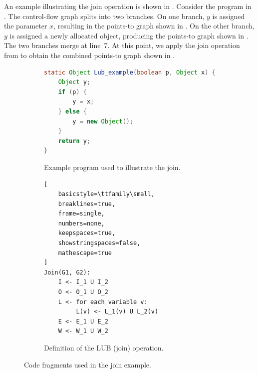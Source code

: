 \documentclass{article}
\begin{document}
An example illustrating the join operation is shown in . Consider the program in . The control-flow graph splits into two branches. On one branch, $y$ is assigned the parameter $x$, resulting in the points-to graph shown in . On the other branch, $y$ is assigned a newly allocated object, producing the points-to graph shown in . The two branches merge at line~7. At this point, we apply the join operation from  to obtain the combined points-to graph shown in .



\begin{figure}[ht]
\centering

\begin{subfigure}{0.48\textwidth}
\begin{lstlisting}[language=Java]
static Object Lub_example(boolean p, Object x) {
    Object y;
    if (p) {
        y = x;      
    } else {
        y = new Object();
    }
    return y;
}
\end{lstlisting}
\caption{Example program used to illustrate the join.}
\label{lst:lub-example}
\end{subfigure}
\hfill
\begin{subfigure}{0.48\textwidth}
\begin{lstlisting}[
    basicstyle=\ttfamily\small,
    breaklines=true,
    frame=single,
    numbers=none,
    keepspaces=true,
    showstringspaces=false,
    mathescape=true
]
Join(G1, G2):
    I <- I_1 U I_2
    O <- O_1 U O_2
    L <- for each variable v:
         L(v) <- L_1(v) U L_2(v)
    E <- E_1 U E_2
    W <- W_1 U W_2
\end{lstlisting}
\caption{Definition of the LUB (join) operation.}
\label{lst:lub-join}
\end{subfigure}

\caption{Code fragments used in the join example.}
\label{fig:lub-code}
\end{figure}
\end{document}
